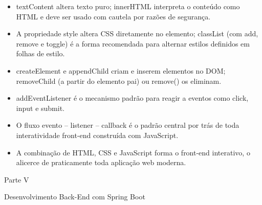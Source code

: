 \begin{itemize}
  \item textContent altera texto puro; innerHTML interpreta o conteúdo como HTML e deve ser usado com cautela por razões de segurança.
\end{itemize}

\begin{itemize}
  \item A propriedade style altera CSS diretamente no elemento; classList (com add, remove e toggle) é a forma recomendada para alternar estilos definidos em folhas de estilo.
\end{itemize}

\begin{itemize}
  \item createElement e appendChild criam e inserem elementos no DOM; removeChild (a partir do elemento pai) ou remove() os eliminam.
\end{itemize}

\begin{itemize}
  \item addEventListener é o mecanismo padrão para reagir a eventos como click, input e submit.
\end{itemize}

\begin{itemize}
  \item O fluxo evento – listener – callback é o padrão central por trás de toda interatividade front-end construída com JavaScript.
\end{itemize}

\begin{itemize}
  \item A combinação de HTML, CSS e JavaScript forma o front-end interativo, o alicerce de praticamente toda aplicação web moderna.
\end{itemize}

Parte V

Desenvolvimento Back-End com Spring Boot
